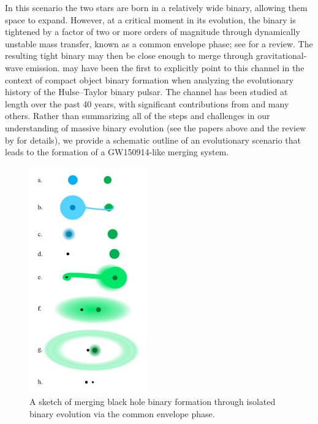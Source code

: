 \documentclass[iop,onecolumn]{revtex4}
\begin{document}
In this scenario the two stars are born in a relatively wide binary, allowing them space to expand.  However, at a critical moment in its evolution, the binary is tightened by a factor of two or more orders of magnitude through dynamically unstable mass transfer, known as a common envelope phase; see \citet{Ivanova:2013} for a review. The resulting tight binary may then be close enough to merge through gravitational-wave emission.  \citet{SmarrBlandford:1976} may have been the first to explicitly point to this channel in the context of compact object binary formation when analyzing the evolutionary history of the Hulse--Taylor binary pulsar. The channel has been studied at length over the past 40 years, with significant contributions from \citet{TutukovYungelson:1993,Lipunov:1997,BetheBrown:1998,Nelemans:2003,VossTauris:2003,Pfahl:2005,Dewi:2006,Kalogera:2007,OShaughnessy:2008,Dominik:2012,Belczynski:2016,EldridgeStanway:2016} and many others. Rather than summarizing all of the steps and challenges in our understanding of massive binary evolution (see the papers above and the review by \citet{PostnovYungelson:2014} for details), we provide a schematic outline of an evolutionary scenario that leads to the formation of a GW150914-like merging system.

\begin{figure}
	\centering
	\includegraphics[width=0.45\textwidth]{channel1.png}
	\caption{\label{fig:isol_binary} A sketch of merging black hole binary formation through isolated binary evolution via the common envelope phase.}
\end{figure}
\end{document}
